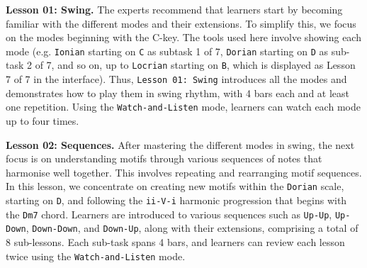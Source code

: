 \documentclass{vgtc}                          %
\begin{document}
\par %
\textbf{Lesson 01: Swing.} The experts recommend that learners start by becoming familiar with the different modes and their extensions. To simplify this, we focus on the modes beginning with the C-key. The tools used here involve showing each mode (e.g. \texttt{Ionian} starting on \texttt{C} as subtask 1 of 7, \texttt{Dorian} starting on \texttt{D} as sub-task 2 of 7, and so on, up to \texttt{Locrian} starting on \texttt{B}, which is displayed as Lesson 7 of 7 in the interface). Thus, \texttt{Lesson 01: Swing} introduces all the modes and demonstrates how to play them in swing rhythm, with 4 bars each and at least one repetition. Using the \texttt{Watch-and-Listen} mode, learners can watch each mode up to four times.

\par %
\textbf{Lesson 02: Sequences.} After mastering the different modes in swing, the next focus is on understanding motifs through various sequences of notes that harmonise well together. This involves repeating and rearranging motif sequences. In this lesson, we concentrate on creating new motifs within the \texttt{Dorian} scale, starting on \texttt{D}, and following the \texttt{ii-V-i} harmonic progression that begins with the \texttt{Dm7} chord. Learners are introduced to various sequences such as \texttt{Up-Up}, \texttt{Up-Down}, \texttt{Down-Down}, and \texttt{Down-Up}, along with their extensions, comprising a total of 8 sub-lessons. Each sub-task spans 4 bars, and learners can review each lesson twice using the \texttt{Watch-and-Listen} mode.
\end{document}
